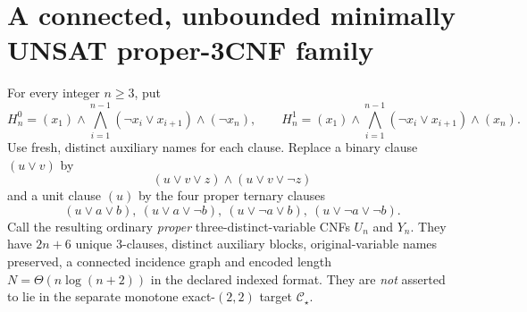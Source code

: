 \documentclass[11pt]{article}
\begin{document}
\section{A connected, unbounded minimally UNSAT proper-3CNF family}
For every integer $n\ge3$, put
\[
H_n^0=(x_1)\wedge\bigwedge_{i=1}^{n-1}(\neg x_i\vee x_{i+1})\wedge(\neg x_n),\qquad
H_n^1=(x_1)\wedge\bigwedge_{i=1}^{n-1}(\neg x_i\vee x_{i+1})\wedge(x_n).
\]
Use fresh, distinct auxiliary names for each clause. Replace a binary clause $(u\vee v)$ by
\[
(u\vee v\vee z)\wedge(u\vee v\vee\neg z)
\]
and a unit clause $(u)$ by the four proper ternary clauses
\[
(u\vee a\vee b),\ (u\vee a\vee\neg b),\
(u\vee\neg a\vee b),\ (u\vee\neg a\vee\neg b).
\]
Call the resulting ordinary \emph{proper} three-distinct-variable CNFs $U_n$ and $Y_n$. They have $2n+6$ unique 3-clauses, distinct auxiliary blocks, original-variable names preserved, a connected incidence graph and encoded length $N=\Theta(n\log(n+2))$ in the declared indexed format. They are \emph{not} asserted to lie in the separate monotone exact-$(2,2)$ target $\mathcal C_\star$.
\end{document}
